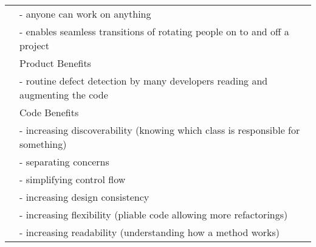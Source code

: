 \documentclass{sig-alternate-05-2015}
\begin{document}
\begin{table*}[t]
\begin{tabular}{p{1.1in}p{5.0in}}
                   & - anyone can work on anything                                                                                                                                                                    \\ 
                   & - enables seamless transitions of rotating people on to and off a project                                                                                                                        \\ 
                   & Product Benefits                                                                                                                                                                               \\ 
                   & - routine defect detection by many developers reading and augmenting the code                                                                                                                    \\ 
                   & Code Benefits                                                                                                                                                                                  \\ 
                   & - increasing discoverability (knowing which class is responsible for something)                                                                                                                  \\ 
                   & - separating concerns                                                                                                                                                                            \\ 
                   & - simplifying control flow                                                                                                                                                                       \\ 
                   & - increasing design consistency                                                                                                                                                                  \\ 
                   & - increasing flexibility (pliable code allowing more refactorings)                                                                                                                               \\ 
                   & - increasing readability (understanding how a method works)                                                                                                                                      \\ 

\end{tabular}
\end{table*}
\end{document}
